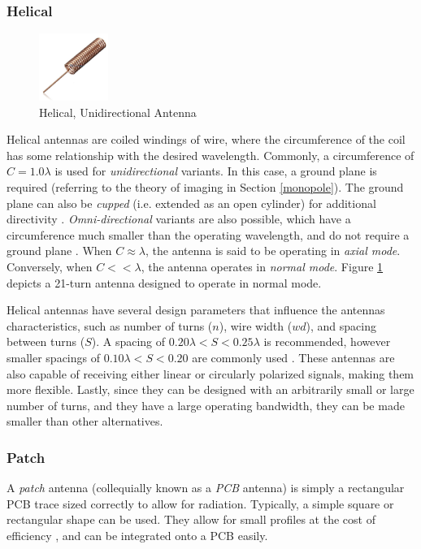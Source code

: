 \subsubsection{Helical}
\begin{figure}[!htb]
  \centering
  \includegraphics[width=0.2\textwidth]{helical_uni}
  \caption{Helical, Unidirectional Antenna}
  \label{fig:helical_uni}
\end{figure}

Helical antennas are coiled windings of wire, where the circumference of the coil has some relationship with the desired wavelength. Commonly, a circumference of $C = 1.0 \lambda$ is used for \textit{unidirectional} variants. In this case, a ground plane is required (referring to the theory of imaging in Section \ref{monopole}). The ground plane can also be \textit{cupped} (i.e. extended as an open cylinder) for additional directivity \cite{textbook-antennaTheoryAnalysisDesign}. \textit{Omni-directional} variants are also possible, which have a circumference much smaller than the operating wavelength, and do not require a ground plane \cite{site-helixAntennas}. When $C \approx \lambda$, the antenna is said to be operating in \textit{axial mode}. Conversely, when $C << \lambda$, the antenna operates in \textit{normal mode}. Figure \ref{fig:helical_uni} depicts a 21-turn antenna designed to operate in normal mode.

Helical antennas have several design parameters that influence the antennas characteristics, such as number of turns ($n$), wire width ($wd$), and spacing between turns ($S$). A spacing of $0.20 \lambda < S < 0.25 \lambda$ is recommended, however smaller spacings of $0.10 \lambda < S < 0.20$ are commonly used \cite{site-helicalCalculator}. These antennas are also capable of receiving either linear or circularly polarized signals, making them more flexible. Lastly, since they can be designed with an arbitrarily small or large number of turns, and they have a large operating bandwidth, they can be made smaller than other alternatives.

\subsubsection{Patch}
A \textit{patch} antenna (collequially known as a \textit{PCB} antenna) is simply a rectangular PCB trace sized correctly to allow for radiation. Typically, a simple square or rectangular shape can be used. They allow for small profiles at the cost of efficiency \cite{site-antennaTheory}, and can be integrated onto a PCB easily.

